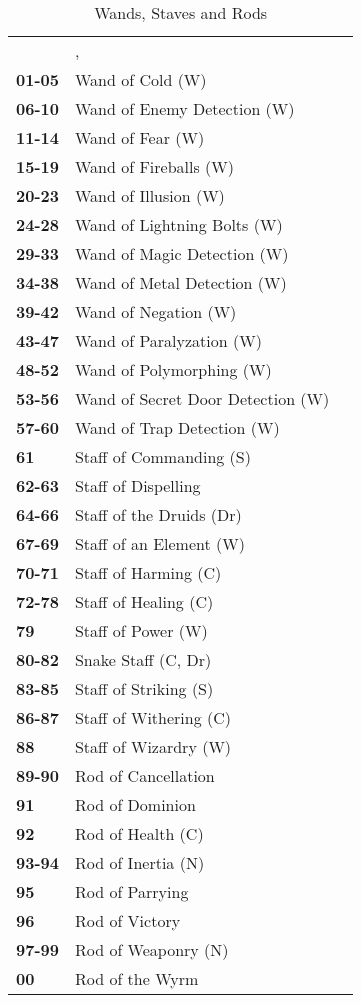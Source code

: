 \begin{multicols*}{2}
\begin {table}[H]
  \caption{Wands, Staves and Rods}
  \begin{tabularx}{\columnwidth}{>{\bfseries}YYY}
	 & , \\
	01-05 & Wand of Cold (W)\\
	06-10 & Wand of Enemy Detection (W)\\
	11-14 & Wand of Fear (W)\\
	15-19 & Wand of Fireballs (W)\\
	20-23 & Wand of Illusion (W)\\
	24-28 & Wand of Lightning Bolts (W)\\
	29-33 & Wand of Magic Detection (W)\\
	34-38 & Wand of Metal Detection (W)\\
	39-42 & Wand of Negation (W)\\
	43-47 & Wand of Paralyzation (W)\\
	48-52 & Wand of Polymorphing (W)\\
	53-56 & Wand of Secret Door Detection (W)\\
	57-60 & Wand of Trap Detection (W)\\
	61 & Staff of Commanding (S)\\
	62-63 & Staff of Dispelling\\
	64-66 & Staff of the Druids (Dr)\\
	67-69 & Staff of an Element (W)\\
	70-71 & Staff of Harming (C)\\
	72-78 & Staff of Healing (C)\\
	79 & Staff of Power (W)\\
	80-82 & Snake Staff (C, Dr)\\
	83-85 & Staff of Striking (S)\\
	86-87 & Staff of Withering (C)\\
	88 & Staff of Wizardry (W)\\
	89-90 & Rod of Cancellation\\
	91 & Rod of Dominion\\
	92 & Rod of Health (C)\\
	93-94 & Rod of Inertia (N)\\
	95 & Rod of Parrying\\
	96 & Rod of Victory\\
	97-99 & Rod of Weaponry (N)\\
	00 & Rod of the Wyrm
  \end {tabularx}
\end {table}


\end{multicols*}
